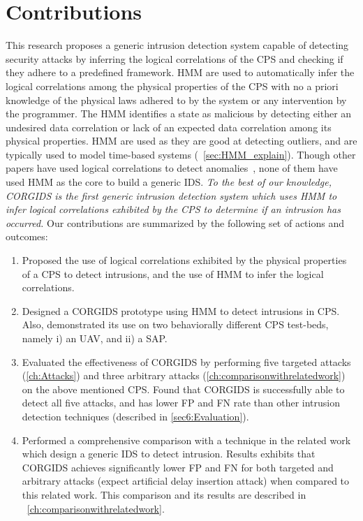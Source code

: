 \section{Contributions}
\label{sec:Contributions}

This research proposes a generic intrusion detection system capable of detecting security attacks by inferring the logical correlations of the \ac{CPS} and checking if they adhere to a predefined framework. \ac{HMM} are used to automatically infer the logical correlations among the physical properties of the \ac{CPS} with no a priori knowledge of the physical laws adhered to by the system or any intervention by the programmer. The \ac{HMM} identifies a state as malicious by detecting either an undesired data correlation or lack of an expected data correlation among its physical properties. \ac{HMM} are used as they are good at detecting outliers, and are typically used to model time-based systems (~\autoref{sec:HMM_explain}).  
Though other papers have used logical correlations to detect anomalies~\cite{iturbe2017feasibility,krotofil2015process,chen2018learning,zohrevand2016hidden}, none of them have used \ac{HMM} as the core to build a generic \ac{IDS}. \textit{To the best of our knowledge, \ac{CORGIDS} is the first generic intrusion detection system which uses \ac{HMM} to infer logical correlations exhibited by the \ac{CPS} to determine if an intrusion has occurred.} Our contributions are summarized by the following set of actions and outcomes:

\begin{enumerate}

\item Proposed the use of logical correlations exhibited by the physical properties of a \ac{CPS} to detect intrusions, and the use of \acf{HMM} to infer the logical correlations.

\item Designed a \acf{CORGIDS} prototype using \acf{HMM} to detect intrusions in \ac{CPS}. Also, demonstrated its use on two behaviorally different \ac{CPS} test-beds, namely i) an \ac{UAV}, and ii) a \acf{SAP}.

\item Evaluated the effectiveness of \ac{CORGIDS} by performing five targeted attacks (\autoref{ch:Attacks}) and three arbitrary attacks (\autoref{ch:comparisonwithrelatedwork}) on the above mentioned \ac{CPS}. Found that \ac{CORGIDS} is successfully able to detect all five attacks, and has lower \acf{FP} and \acf{FN} rate than other intrusion detection techniques (described in \autoref{sec6:Evaluation}).

\item Performed a comprehensive comparison with a technique in the related work which design a generic IDS to detect intrusion. Results exhibits that \ac{CORGIDS} achieves significantly lower \ac{FP} and \ac{FN} for both targeted and arbitrary attacks (expect artificial delay insertion attack) when compared to this related work. This comparison and its results are described in ~\autoref{ch:comparisonwithrelatedwork}.


\end{enumerate}

